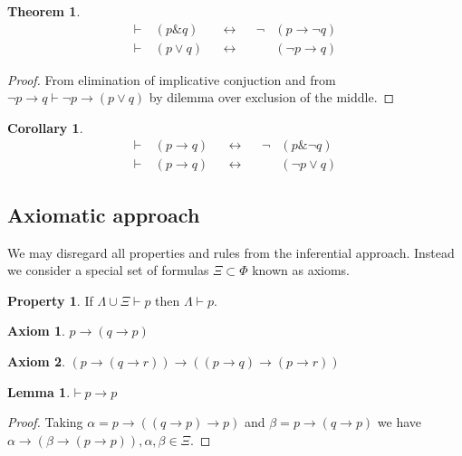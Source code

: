 \documentclass{amsbook}
\newcommand{\infers}{\mathrel\vdash}
\newcommand{\theorem}{\mathord\vdash\medspace}
\newcommand{\then}{\mathrel\rightarrow}
\newcommand{\conj}{\mathrel\&}
\newcommand{\eqv}{\mathrel\leftrightarrow}
\newcommand{\disj}{\mathrel\vee}
\theoremstyle{definition}
\newtheorem{axm}{Axiom}[chapter]
\newtheorem{prop}{Property}[section]
\newtheorem{thm}{Theorem}[section]
\newtheorem{lmm}{Lemma}[section]
\newtheorem{crl}{Corollary}[section]
\begin{document}
\begin{thm}
    \begin{align*}
         & \theorem & (p \conj q) &  & \eqv &  & \neg & (p \then \neg q) & \\
         & \theorem & (p \disj q) &  & \eqv &  &      & (\neg p \then q) &
    \end{align*}
    \begin{proof}
        From elimination of implicative conjuction and from $\neg p \then q \infers \neg p \then (p \disj q)$ by dilemma over exclusion of the middle.
    \end{proof}
\end{thm}

\begin{crl}
    \begin{align*}
         & \theorem & (p \then q) &  & \eqv &  & \neg & (p \conj \neg q) & \\
         & \theorem & (p \then q) &  & \eqv &  &      & (\neg p \disj q) &
    \end{align*}
\end{crl}

\subsection{Axiomatic approach}

We may disregard all properties and rules from the inferential approach. Instead we consider a special set of formulas $\Xi \subset \Phi$ known as axioms.

\begin{prop}
    If $\varLambda \cup \Xi \infers p$ then $\varLambda \infers p$.
\end{prop}

\begin{axm}
    $p \then (q \then p)$
\end{axm}

\begin{axm}
    $(p \then (q \then r)) \then ((p \then q) \then (p \then r))$
\end{axm}

\begin{lmm}
    $\theorem p \then p$
    \begin{proof}
        Taking $\alpha = p \then ((q \then p) \then p)$ and $\beta = p \then (q \then p)$ we have $\alpha \then (\beta \then (p \then p)), \alpha, \beta \in \Xi$.
    \end{proof}
\end{lmm}
\end{document}
